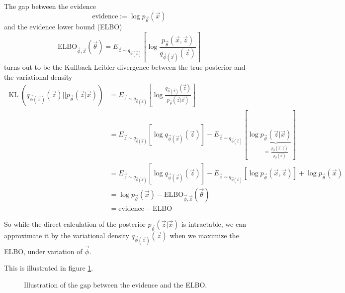 The gap between the evidence
\begin{equation}
    \text{evidence} := \log p_\vec{\theta}(\vec{x})
\end{equation}
and the evidence lower bound (ELBO)
\begin{equation}
    \text{ELBO}_{\vec{\phi},\vec{x}}(\vec{\theta}) = E_{\vec{z} \sim q_{\vec{\phi}(\vec{x})}} \left[ \log \frac{p_\vec{\theta}(\vec{x},\vec{z})}{q_{\vec{\phi}(\vec{x})}(\vec{z})} \right]
\end{equation}
turns out to be the Kullback-Leibler divergence between the true posterior and the variational density
\begin{equation}
    \begin{aligned}
        \operatorname{KL}(q_{\vec{\phi}(\vec{x})}(\vec{z}) || p_{\vec{\theta}}(\vec{z} | \vec{x})) &= E_{\vec{z} \sim q_{\vec{\phi}(\vec{x})}} \left[ \log \frac{q_{\vec{\phi}(\vec{x})}(\vec{z})}{p_{\vec{\theta}}(\vec{z} | \vec{x})} \right] \\
        &= E_{\vec{z} \sim q_{\vec{\phi}(\vec{x})}} \left[ \log q_{\vec{\phi}(\vec{x})}(\vec{z})\right] - E_{\vec{z} \sim q_{\vec{\phi}(\vec{x})}} \left[ \log \underbrace{p_{\vec{\theta}}(\vec{z} | \vec{x})}_{=\, \frac{p_\vec{\theta}(\vec{x},\vec{z})}{p_\vec{\theta}(\vec{x})}} \right] \\
        &= E_{\vec{z} \sim q_{\vec{\phi}(\vec{x})}} \left[ \log q_{\vec{\phi}(\vec{x})}(\vec{z})\right] - E_{\vec{z} \sim q_{\vec{\phi}(\vec{x})}} \left[ \log p_{\vec{\theta}}(\vec{x},\vec{z}) \right] + \log p_\vec{\theta}(\vec{x}) \\
        &= \log p_\vec{\theta}(\vec{x}) - \text{ELBO}_{\vec{\phi},\vec{x}}(\vec{\theta}) \\
        &= \text{evidence} - \text{ELBO}
    \end{aligned}
\end{equation}

So while the direct calculation of the posterior $p_{\vec{\theta}}(\vec{z} | \vec{x})$ is intractable, we can
approximate it by the variational density $q_{\vec{\phi}(\vec{x})}(\vec{z})$ when we maximize the ELBO, under
variation of $\vec{\phi}$.

This is illustrated in figure \ref{fig:elbo_gap}.

\begin{figure}[!htb]
    \centering
    
    \caption{Illustration of the gap between the evidence and the ELBO.}
    \label{fig:elbo_gap}
\end{figure}

